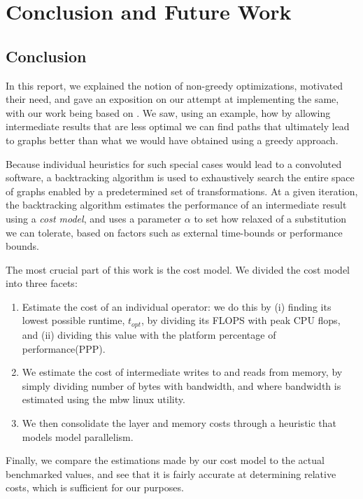 \documentclass[12pt,a4paper,twoside,openright,bibliography=totocnumbered]{report}
\begin{document}
\chapter{Conclusion and Future Work}
\section{Conclusion}
In this report, we explained the notion of non-greedy optimizations, motivated their need, and gave an exposition on our attempt at implementing the same, with our work being based on \cite{jia2019}. We saw, using an example, how by allowing intermediate results that are less optimal we can find paths that ultimately lead to graphs better than what we would have obtained using a greedy approach. 

Because individual heuristics for such special cases would lead to a convoluted software, a backtracking algorithm is used to exhaustively search the entire space of graphs enabled by a predetermined set of transformations. At a given iteration, the backtracking algorithm estimates the performance of an intermediate result using a \textit{cost model}, and uses a parameter $\alpha$ to set how relaxed of a substitution we can tolerate, based on factors such as external time-bounds or performance bounds. 

The most crucial part of this work is the cost model. We divided the cost model into three facets:
\begin{enumerate}
    \item Estimate the cost of an individual operator: we do this by (i) finding its lowest possible runtime, $t_{opt}$, by dividing its FLOPS with peak CPU flops, and (ii) dividing this value with the platform percentage of performance(PPP).
    \item We estimate the cost of intermediate writes to and reads from memory, by simply dividing number of bytes with bandwidth, and where bandwidth is estimated using the mbw linux utility.
    \item We then consolidate the layer and memory costs through a heuristic that models model parallelism.
\end{enumerate}

Finally, we compare the estimations made by our cost model to the actual benchmarked values, and see that it is fairly accurate at determining relative costs, which is sufficient for our purposes.
\end{document}
